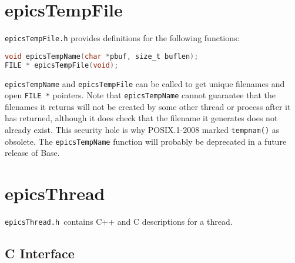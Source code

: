 \section{epicsTempFile}

\verb|epicsTempFile.h| provides definitions for the following functions:

\begin{lstlisting}[language=C]
void epicsTempName(char *pbuf, size_t buflen);
FILE * epicsTempFile(void);
\end{lstlisting}

\verb|epicsTempName| and \verb|epicsTempFile| can be called to get unique filenames and open \verb|FILE *| pointers.
Note that \verb|epicsTempName| cannot guarantee that the filenames it returns will not be created by some other thread or process after it has returned, although it does check that the filename it generates does not already exist.
This security hole is why POSIX.1-2008 marked \verb|tempnam()| as obsolete.
The \verb|epicsTempName| function will probably be deprecated in a future release of Base.

\section{epicsThread}

\verb|epicsThread.h |contains C++ and C descriptions for a thread.

\subsection{C Interface}

